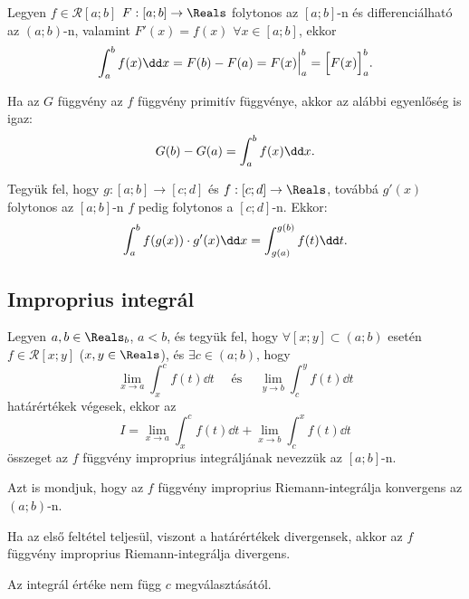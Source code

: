 \begin{theorem}
  Legyen $f \in \mathcal R [a; b]$ $F: [a; b] \rightarrow \Reals$ folytonos az
  $[a; b]$-n és differenciálható az $(a; b)$-n, valamint $F'(x) = f(x)$ $\forall
    x \in [a; b]$, ekkor
  \[
    \int_a^b f(x) \dd x = F(b) - F(a) = F(x) \Big|_a^b = \Big[ F(x) \Big]_a^b
    \text.
  \]
\end{theorem}

\begin{note}
  Ha az $G$ függvény az $f$ függvény primitív függvénye, akkor az alábbi
  egyenlőség is igaz:
  \[
    G(b) - G(a) = \int_a^b f(x) \dd x
    \text.
  \]
\end{note}

\begin{theorem}
  Tegyük fel, hogy $g: [a; b] \rightarrow [c; d]$ és $f: [c; d] \rightarrow
    \Reals$, továbbá $g'(x)$ folytonos az $[a; b]$-n $f$ pedig folytonos a
  $[c; d]$-n. Ekkor:
  \[
    \int_a^b f(g(x)) \cdot g'(x) \dd x = \int_{g(a)}^{g(b)} f(t) \dd t
    \text.
  \]
\end{theorem}

\subsection{Improprius integrál}

\begin{definition}
  Legyen $a, b \in  \Reals_b$, $a < b$, és tegyük fel, hogy $\forall [x; y]
    \subset (a; b)$ esetén $f \in \mathcal R [x; y]$ ($x, y \in \Reals$), és
  $\exists c \in (a; b)$, hogy
  \[
    \lim_{x \rightarrow a} \int_x^c f(t) \dd t
    \quad \text{ és } \quad
    \lim_{y \rightarrow b} \int_c^y f(t) \dd t
  \]
  határértékek végesek, ekkor az
  \[
    I
    = \lim_{x \rightarrow a} \int_x^c f(t) \dd t
    + \lim_{x \rightarrow b} \int_c^x f(t) \dd t
  \]
  összeget az $f$ függvény improprius integráljának nevezzük az $[a; b]$-n.

  Azt is mondjuk, hogy az $f$ függvény improprius Riemann-integrálja konvergens
  az $(a; b)$-n.

  Ha az első feltétel teljesül, viszont a határértékek divergensek, akkor az $f$
  függvény improprius Riemann-integrálja divergens.
\end{definition}

\begin{note}
  Az integrál értéke nem függ $c$ megválasztásától.
\end{note}

